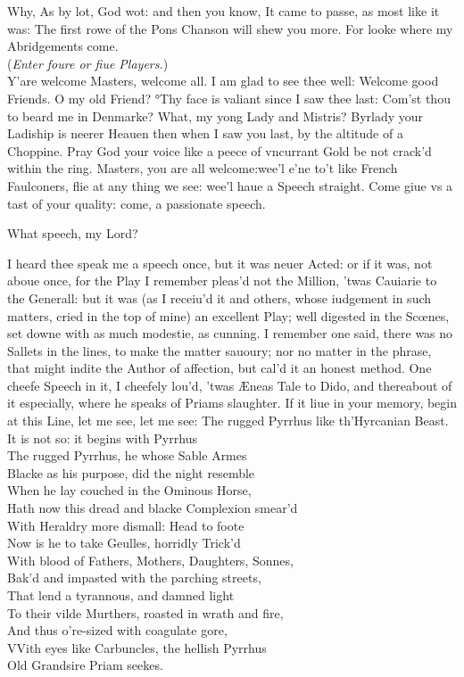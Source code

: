 \documentclass[a5paper,DIV=calc,11pt]{scrbook}
\begin{document}
\begin{drama*}
    \hamspeaks Why, As by lot, God wot: and then you know, It came to passe, as most like it was: The first rowe of the Pons Chanson will shew you more. For looke where my Abridgements come.\\
    (\textit{Enter foure or fiue Players.})\\
    Y'are welcome Masters, welcome all. I am glad to see thee well: Welcome good Friends. O my old Friend? °Thy face is valiant since I saw thee last: Com'st thou to beard me in Denmarke? What, my yong Lady and Mistris? Byrlady your Ladiship is neerer Heauen then when I saw you last, by the altitude of a Choppine. Pray God your voice like a peece of vncurrant Gold be not crack'd within the ring. Masters, you are all welcome:wee'l e'ne to't like French Faulconers, flie at any thing we see: wee'l haue a Speech straight. Come giue vs a tast of your quality: come, a passionate speech.
    
    
     What speech, my Lord?
    
    \hamspeaks I heard thee speak me a speech once, but it was neuer Acted: or if it was, not aboue once, for the Play I remember pleas'd not the Million, 'twas Cauiarie to the Generall: but it was (as I receiu'd it and others, whose iudgement in such matters, cried in the top of mine) an excellent Play; well digested in the Scœnes, set downe with as much modestie, as cunning. I remember one said, there was no Sallets in the lines, to make the matter sauoury; nor no matter in the phrase, that might indite the Author of affection, but cal'd it an honest method. One cheefe Speech in it, I cheefely lou'd, 'twas Æneas Tale to Dido, and thereabout of it especially, where he speaks of Priams slaughter. If it liue in your memory, begin at this Line, let me see, let me see: The rugged Pyrrhus like th'Hyrcanian Beast. It is not so: it begins with Pyrrhus\\
    The rugged Pyrrhus, he whose Sable Armes\\
    Blacke as his purpose, did the night resemble\\
    When he lay couched in the Ominous Horse,\\
    Hath now this dread and blacke Complexion smear'd\\
    With Heraldry more dismall: Head to foote\\
    Now is he to take Geulles, horridly Trick'd\\
    With blood of Fathers, Mothers, Daughters, Sonnes,\\
    Bak'd and impasted with the parching streets,\\
    That lend a tyrannous, and damned light\\
    To their vilde Murthers, roasted in wrath and fire,\\
    And thus o're-sized with coagulate gore,\\
    VVith eyes like Carbuncles, the hellish Pyrrhus\\
    Old Grandsire Priam seekes.
    

\end{drama*}
\end{document}
